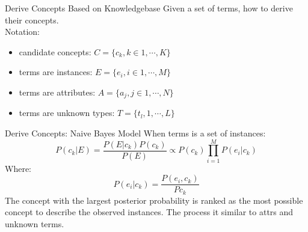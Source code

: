 \documentclass[11pt, a4paper]{beamer}
\begin{document}
\begin{frame}{Derive Concepts Based on Knowledgebase}
Given a set of terms, how to derive their concepts.\\
Notation:
\begin{itemize}
    \item candidate concepts: $C = \{c_{k}, k \in 1,\cdots,K\}$
    \item terms are instances: $ E = \{ e_{i}, i \in 1,\cdots,M\}$
    \item terms are attributes: $ A = \{ a_{j}, j \in 1,\cdots,N\}$
    \item terms are unknown types: $ T = \{t_{l}, 1,\cdots,L\}$
\end{itemize}
\end{frame}

\begin{frame}{Derive Concepts: Naive Bayes Model}
When terms is a set of instances:
\begin{displaymath}
    P(c_{k} | E) = \frac{P(E|c_{k})P(c_{k})}{P(E)} \propto P(c_{k})\prod_{i = 1}^{M} P(e_{i} | c_{k})
\end{displaymath}
Where:
\begin{displaymath}
    P(e_{i} | c_{k}) = \frac{P(e_{i}, c_{k})}{P{c_{k}}}
\end{displaymath}
The concept with the largest posterior probability is ranked as the most possible concept to describe the observed instances. The process it similar to attrs and unknown terms.
\end{frame}
\end{document}
